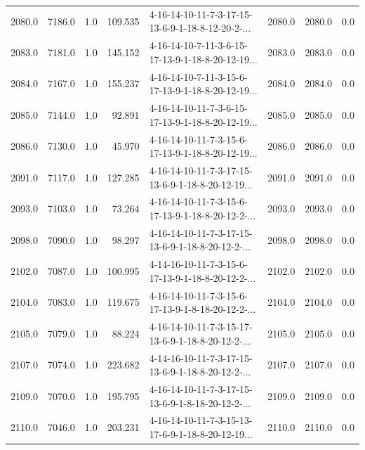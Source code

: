 \begin{tabular}{rrrrlrrr}
 2080.0 &  7186.0 &            1.0 &            109.535 &  4-16-14-10-11-7-3-17-15-13-6-9-1-18-8-12-20-2-... &        2080.0 &          2080.0 &       0.0 \\
 2083.0 &  7181.0 &            1.0 &            145.152 &  4-16-14-10-7-11-3-6-15-17-13-9-1-18-8-20-12-19... &        2083.0 &          2083.0 &       0.0 \\
 2084.0 &  7167.0 &            1.0 &            155.237 &  4-16-14-10-7-11-3-15-6-17-13-9-1-18-8-20-12-19... &        2084.0 &          2084.0 &       0.0 \\
 2085.0 &  7144.0 &            1.0 &             92.891 &  4-16-14-10-11-7-3-6-15-17-13-9-1-18-8-20-12-19... &        2085.0 &          2085.0 &       0.0 \\
 2086.0 &  7130.0 &            1.0 &             45.970 &  4-16-14-10-11-7-3-15-6-17-13-9-1-18-8-20-12-19... &        2086.0 &          2086.0 &       0.0 \\
 2091.0 &  7117.0 &            1.0 &            127.285 &  4-16-14-10-11-7-3-17-15-13-6-9-1-18-8-20-12-19... &        2091.0 &          2091.0 &       0.0 \\
 2093.0 &  7103.0 &            1.0 &             73.264 &  4-16-14-10-11-7-3-15-6-17-13-9-1-18-8-20-12-2-... &        2093.0 &          2093.0 &       0.0 \\
 2098.0 &  7090.0 &            1.0 &             98.297 &  4-16-14-10-11-7-3-17-15-13-6-9-1-18-8-20-12-2-... &        2098.0 &          2098.0 &       0.0 \\
 2102.0 &  7087.0 &            1.0 &            100.995 &  4-14-16-10-11-7-3-15-6-17-13-9-1-18-8-20-12-2-... &        2102.0 &          2102.0 &       0.0 \\
 2104.0 &  7083.0 &            1.0 &            119.675 &  4-16-14-10-11-7-3-15-6-17-13-9-1-8-18-20-12-2-... &        2104.0 &          2104.0 &       0.0 \\
 2105.0 &  7079.0 &            1.0 &             88.224 &  4-16-14-10-11-7-3-15-17-13-6-9-1-18-8-20-12-2-... &        2105.0 &          2105.0 &       0.0 \\
 2107.0 &  7074.0 &            1.0 &            223.682 &  4-14-16-10-11-7-3-17-15-13-6-9-1-18-8-20-12-2-... &        2107.0 &          2107.0 &       0.0 \\
 2109.0 &  7070.0 &            1.0 &            195.795 &  4-16-14-10-11-7-3-17-15-13-6-9-1-8-18-20-12-2-... &        2109.0 &          2109.0 &       0.0 \\
 2110.0 &  7046.0 &            1.0 &            203.231 &  4-16-14-10-11-7-3-15-13-17-6-9-1-18-8-20-12-19... &        2110.0 &          2110.0 &       0.0 \\

\end{tabular}
